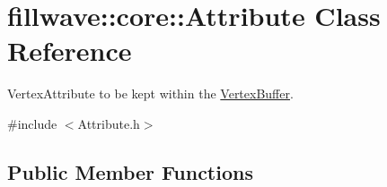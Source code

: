\hypertarget{classfillwave_1_1core_1_1Attribute}{}\section{fillwave\+:\+:core\+:\+:Attribute Class Reference}
\label{classfillwave_1_1core_1_1Attribute}


Vertex\+Attribute to be kept within the \hyperlink{classfillwave_1_1core_1_1VertexBuffer}{Vertex\+Buffer}.  




{\ttfamily \#include $<$Attribute.\+h$>$}

\subsection*{Public Member Functions}
